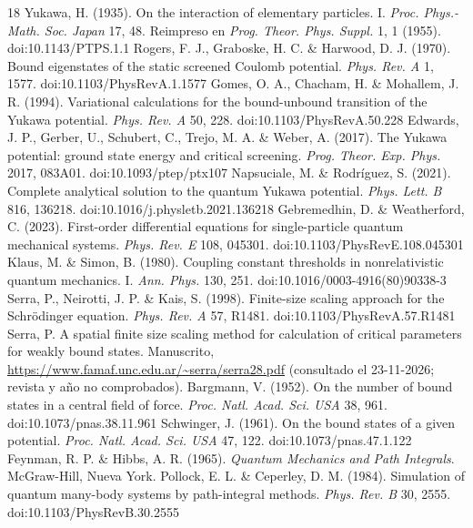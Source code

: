 \documentclass[10pt,letterpaper]{article}
\begin{document}
\begingroup\footnotesize\setlength{\itemsep}{0pt}
\begin{thebibliography}{18}\setlength{\itemsep}{0pt}\setlength{\parskip}{0pt}
 Yukawa, H. (1935). On the interaction of elementary particles. I. \textit{Proc. Phys.-Math. Soc. Japan} 17, 48. Reimpreso en \textit{Prog. Theor. Phys. Suppl.} 1, 1 (1955). doi:10.1143/PTPS.1.1
 Rogers, F. J., Graboske, H. C. \& Harwood, D. J. (1970). Bound eigenstates of the static screened Coulomb potential. \textit{Phys. Rev. A} 1, 1577. doi:10.1103/PhysRevA.1.1577
 Gomes, O. A., Chacham, H. \& Mohallem, J. R. (1994). Variational calculations for the bound-unbound transition of the Yukawa potential. \textit{Phys. Rev. A} 50, 228. doi:10.1103/PhysRevA.50.228
 Edwards, J. P., Gerber, U., Schubert, C., Trejo, M. A. \& Weber, A. (2017). The Yukawa potential: ground state energy and critical screening. \textit{Prog. Theor. Exp. Phys.} 2017, 083A01. doi:10.1093/ptep/ptx107
 Napsuciale, M. \& Rodríguez, S. (2021). Complete analytical solution to the quantum Yukawa potential. \textit{Phys. Lett. B} 816, 136218. doi:10.1016/j.physletb.2021.136218
 Gebremedhin, D. \& Weatherford, C. (2023). First-order differential equations for single-particle quantum mechanical systems. \textit{Phys. Rev. E} 108, 045301. doi:10.1103/PhysRevE.108.045301
 Klaus, M. \& Simon, B. (1980). Coupling constant thresholds in nonrelativistic quantum mechanics. I. \textit{Ann. Phys.} 130, 251. doi:10.1016/0003-4916(80)90338-3
 Serra, P., Neirotti, J. P. \& Kais, S. (1998). Finite-size scaling approach for the Schrödinger equation. \textit{Phys. Rev. A} 57, R1481. doi:10.1103/PhysRevA.57.R1481
 Serra, P. A spatial finite size scaling method for calculation of critical parameters for weakly bound states. Manuscrito, \url{https://www.famaf.unc.edu.ar/~serra/serra28.pdf} (consultado el 23-11-2026; revista y año no comprobados).
 Bargmann, V. (1952). On the number of bound states in a central field of force. \textit{Proc. Natl. Acad. Sci. USA} 38, 961. doi:10.1073/pnas.38.11.961
 Schwinger, J. (1961). On the bound states of a given potential. \textit{Proc. Natl. Acad. Sci. USA} 47, 122. doi:10.1073/pnas.47.1.122
 Feynman, R. P. \& Hibbs, A. R. (1965). \textit{Quantum Mechanics and Path Integrals}. McGraw-Hill, Nueva York.
 Pollock, E. L. \& Ceperley, D. M. (1984). Simulation of quantum many-body systems by path-integral methods. \textit{Phys. Rev. B} 30, 2555. doi:10.1103/PhysRevB.30.2555

\end{thebibliography}
\end{document}
